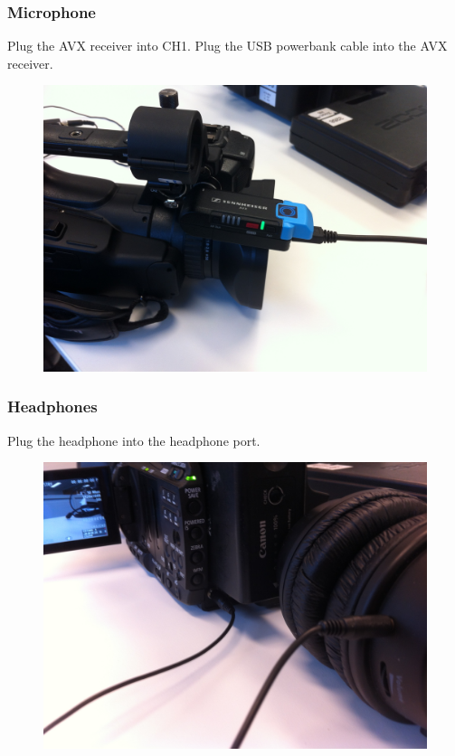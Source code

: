 \documentclass{article}
\begin{document}
\subsubsection{Microphone}
Plug the AVX receiver into CH1. Plug the USB powerbank cable into the AVX receiver.

\begin{figure}[H]
  \centering
\includegraphics[width = 120mm]{canon_avx_receiver.jpg}
\end{figure}

\subsubsection{Headphones}
Plug the headphone into the headphone port.

\begin{figure}[H]
  \centering
\includegraphics[width = 120mm]{canon_headphones.jpg}
\end{figure}
\end{document}
